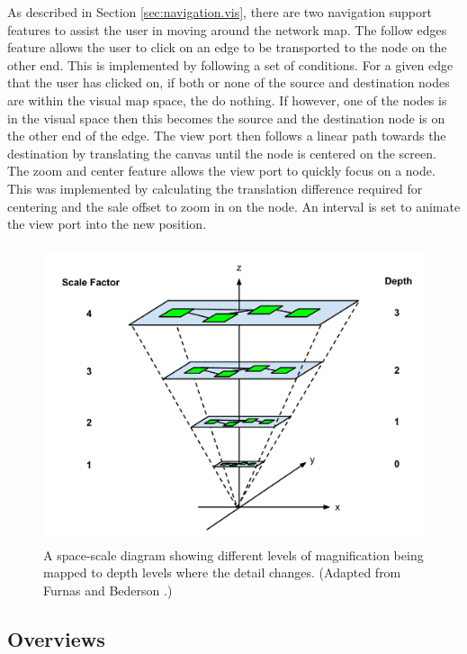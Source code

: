 \documentclass[11pt, a4paper]{article}
\begin{document}
As described in Section \ref{sec:navigation.vis}, there are two navigation support
features to assist the user in moving around the network map. The follow edges
feature allows the user to click on an edge to be transported to the node on the
other end. This is implemented by following a set of conditions. For a given
edge that the user has clicked on, if both or none of the source and destination
nodes are within the visual map space, the do nothing. If however, one of the
nodes is in the visual space then this becomes the source and the destination
node is on the other end of the edge. The view port then follows a linear path
towards the destination by translating the canvas until the node is centered on
the screen. The zoom and center feature allows the view port to quickly focus on
a node. This was implemented by calculating the translation difference required
for centering and the sale offset to zoom in on the node. An interval is set to
animate the view port into the new position.

\begin{figure} \centering
\includegraphics[width=120mm,height=87.2mm]{assets/nav2-0.pdf}
\caption{A space-scale diagram showing different levels of magnification being
mapped to depth levels where the detail changes. (Adapted from Furnas and
Bederson \cite{Furnas_1995}.) } 
\label{fig:nav2.0} 
\end{figure}

\subsection{Overviews}
\label{sec:overviews.impl}
\end{document}
